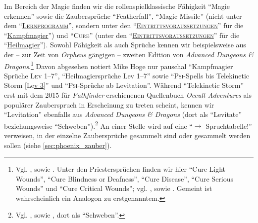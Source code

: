 \documentclass[a5paper,pagesize,numbers=noenddot]{scrbook}
\begin{document}
Im Bereich der Magie finden wir die rollenspielklassische Fähigkeit \enquote{Magie erkennen}\autocite[S.~2, 7]{orpheus_gildensystem} sowie die Zaubersprüche \enquote{Featherfall}\autocite[S.~9]{orpheus_gildensystem}, \enquote{Magic Missile} (nicht unter dem \enquote{\textsc{\uline{Lernprogramm}}}, sondern unter den \enquote{\textsc{\uline{Eintrittsvoraussetzun\-gen}}} für die \enquote{\uline{Kampfmagier}})\autocite[S.~2]{orpheus_gildensystem} und \enquote{\textsc{Cure}} (unter den \enquote{\textsc{\uline{Eintrittsvoraus\-setzungen}}} für die \enquote{\uline{Heilmagier}}).\autocite[S.~7]{orpheus_gildensystem}
Sowohl Fähigkeit als auch Sprüche kennen wir beispielsweise aus der -- zur Zeit von \textit{Orpheus} gängigen -- zweiten Edition von \textit{Advanced Dungeons \& Dragons}.\footnote{Vgl. \autocite[S.~133, 134, 136]{cook_adnd_1989}, sowie \autocite[S.~171, 173]{cook_adnd_1996}. Unter den Priestersprüchen finden wir hier \enquote{Cure Light Wounds}, \enquote{Cure Blindness or Deafness}, \enquote{Cure Disease}, \enquote{Cure Serious Wounds} und \enquote{Cure Critical Wounds}; vgl. \autocite[S.~199, 209\,f., 217, 222]{cook_adnd_1989}, sowie \autocite[S.~249, 261\,f., 264\,f., 272\,f., 278]{cook_adnd_1996}. Gemeint ist wahrscheinlich ein Analogon zu erstgenanntem.} %
Davon abgesehen notiert Mike Hoge nur pauschal \enquote{Kampfmagier Sprüche \textsc{Lev} 1--7},\autocite[S.~2]{orpheus_gildensystem} \enquote{Heilmagiersprüche Lev 1--7}\autocite[S.~7]{orpheus_gildensystem} sowie \enquote{\textsc{Psi}-Spells bis Telekinetic Storm [Le\uline{v 3}]}\autocite[S.~10]{orpheus_gildensystem} und \enquote{\textsc{Psi}-Sprüche ab Levitation}.\autocite[S.~11]{orpheus_gildensystem}
Während \enquote{Telekinetic Storm} erst mit dem 2015 für \textit{Pathfinder} erschienenen Quellenbuch \textit{Occult Adventures} als populärer Zauberspruch in Erscheinung zu treten scheint,\autocite[Vgl.][S.~188]{bulmahn_pathfinder_2015} kennen wir \enquote{Levitation} ebenfalls aus \textit{Advanced Dungeons \& Dragons} (dort als \enquote{Levitate} beziehungsweise \enquote{Schweben}).\footnote{Vgl. \autocite[S.~143]{cook_adnd_1989}, sowie \autocite[S.~186]{cook_adnd_1996}, dort als \enquote{Schweben}.} %
An einer Stelle wird auf eine \enquote{$\rightarrow$ Spruchtabelle!}\autocite[S.~10]{orpheus_gildensystem} verweisen, in der einzelne Zaubersprüche gesammelt sind oder gesammelt werden sollen (siehe \autoref{sec:phoenix_zauber}).
\end{document}
